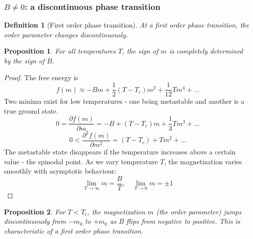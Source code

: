 \documentclass[a4paper]{article}
\theoremstyle{new}
\newtheorem{defi}{Definition}[section]
\newtheorem{prop}{Proposition}[section]
\begin{document}
\subsubsection*{$B\neq 0$: a discontinuous phase transition}
\begin{defi}[First order phase transition]
At a first order phase transition, the order parameter changes discontinuously.
\end{defi}
\begin{prop}
For all temperatures $T$, the sign of $m$ is completely determined by the sign of $B$.
\end{prop}
\begin{proof}
The free energy is
$$f(m)\approx-Bm+\frac{1}{2}(T-T_c)m^2+\frac{1}{12}Tm^4+\dots$$
Two minima exist for low temperatures - one being metastable and another is a true ground state. 
$$0=\frac{\partial f(m)}{\partial m}=-B+(T-T_c)m+\frac{1}{3}Tm^3+\dots$$
$$0<\frac{\partial^2f(m)}{\partial m^2}=(T-T_c)+Tm^2+\dots$$
The metastable state disappears if the temperature increases above a certain value - the spinodal point. As we vary temperature $T$, the magnetization varies smoothly with asymptotic behaviour:
$$\lim_{T\rightarrow\infty}m=\frac{B}{T},\quad\lim_{T\rightarrow0}m=\pm1$$
\end{proof}
\begin{center}
\end{center}
\begin{prop}
For $T<T_c$, the magnetization $m$ (the order parameter) jumps discontinuously from $-m_0$ to $+m_0$ as $B$ flips from negative to positive. This is characteristic of a first order phase transition.
\end{prop}
\end{document}
